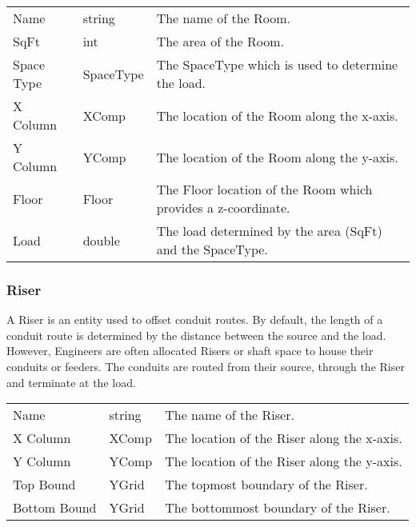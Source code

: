 \documentclass[letterpaper,10pt,english]{sphinxmanual}
\begin{document}
\begin{savenotes}\sphinxattablestart
\centering
\begin{tabulary}{\linewidth}[t]{|T|T|T|}
\hline
\sphinxstyletheadfamily 
{}
&\sphinxstyletheadfamily 
{}
&\sphinxstyletheadfamily 
{}
\\
\hline
Name
&
string
&
The name of the Room.
\\
\hline
SqFt
&
int
&
The area of the Room.
\\
\hline
Space Type
&
SpaceType
&
The SpaceType which is used to determine the load.
\\
\hline
X Column
&
XComp
&
The location of the Room along the x-axis.
\\
\hline
Y Column
&
YComp
&
The location of the Room along the y-axis.
\\
\hline
Floor
&
Floor
&
The Floor location of the Room which provides a z-coordinate.
\\
\hline
Load
&
double
&
The load determined by the area (SqFt) and the SpaceType.
\\
\hline
\end{tabulary}
\par
\sphinxattableend\end{savenotes}


\subsubsection{Riser}
\label{\detokenize{docs/definitions/index-definitions:riser}}\label{\detokenize{docs/definitions/index-definitions:riser-definition}}
A Riser is an entity used to offset conduit routes.  By default, the length of a conduit route is determined by the distance between the source and the load.  However, Engineers are often allocated Risers or shaft space to house their conduits or feeders.  The conduits are routed from their source, through the Riser and terminate at the load.


\begin{savenotes}\sphinxattablestart
\centering
\begin{tabulary}{\linewidth}[t]{|T|T|T|}
\hline
\sphinxstyletheadfamily 
{}
&\sphinxstyletheadfamily 
{}
&\sphinxstyletheadfamily 
{}
\\
\hline
Name
&
string
&
The name of the Riser.
\\
\hline
X Column
&
XComp
&
The location of the Riser along the x-axis.
\\
\hline
Y Column
&
YComp
&
The location of the Riser along the y-axis.
\\
\hline
Top Bound
&
YGrid
&
The topmost boundary of the Riser.
\\
\hline
Bottom Bound
&
YGrid
&
The bottommost boundary of the Riser.
\\
\hline
\end{tabulary}
\par
\sphinxattableend\end{savenotes}
\end{document}
